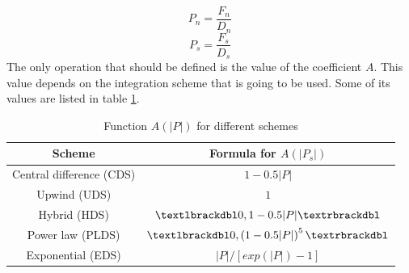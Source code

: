 \begin{equation}
P_{n}=\frac{F_{n}}{D_{n}}
\end{equation}
\begin{equation}
P_{s}=\frac{F_{s}}{D_{s}}
\end{equation}
The only operation that should be defined is the value of the coefficient $A$. This value depends on the integration scheme that is going to be used. Some of its values are listed in table \ref{Patankarvalues}.
\begin{table}[h]
	\centering
	\begin{tabular}{ |c|c| }
		\hline
		Scheme & Formula for $A\left(|P_{s}|\right)$ \\ \hline
		Central difference (CDS) & $1-0.5|P|$ \\ \hline
		Upwind (UDS) & $1$ \\ \hline
		Hybrid (HDS) & $\textlbrackdbl0,1-0.5|P|\textrbrackdbl$ \\ \hline
		Power law (PLDS) & $\textlbrackdbl0,\left(1-0.5|P|\right)^{5}\textrbrackdbl$ \\ \hline
		Exponential (EDS) & $|P|/\left[exp\left(|P|\right)-1\right]$ \\ \hline
	\end{tabular}
	\caption{Function $A(|P|)$ for different schemes\cite{Patankar1980}}
	\label{Patankarvalues}
\end{table}